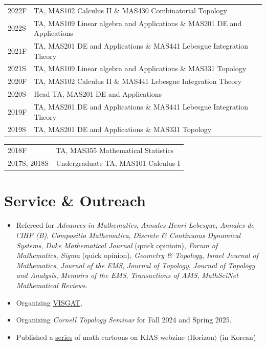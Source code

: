 \documentclass[a4paper, 10pt]{article}
\begin{document}
\begin{tabular}{Q{2.5cm}P{13cm}}
\small{2022F} & TA, MAS102 Calculus II \& MAS430 Combinatorial Topology \\
\small{2022S} & TA, MAS109 Linear algebra and Applications \& MAS201 DE and Applications \\
\small{2021F} & TA, MAS201 DE and Applications \& MAS441 Lebesgue Integration Theory\\
\small{2021S} & TA, MAS109 Linear algebra and Applications \& MAS331 Topology\\
\small{2020F}& TA, MAS102 Calculus II \& MAS441 Lebesgue Integration Theory\\
\small{2020S} & Head TA, MAS201 DE and Applications\\
\small{2019F} & TA, MAS201 DE and Applications \& MAS441 Lebesgue Integration Theory\\
\small{2019S} & TA, MAS201 DE and Applications \& MAS331 Topology\\
\end{tabular}

\begin{tabular}{Q{2.45cm}P{13cm}}
\small{2018F} & TA, MAS355 Mathematical Statistics \\
\small{2017S, 2018S} & Undergraduate TA, MAS101 Calculus I\\
\end{tabular}

\section{Service \& Outreach}
\vspace{5pt}

\begin{itemize}
\item Refereed for \emph{Advances in Mathematics}, \emph{Annales Henri Lebesgue}, \emph{Annales de l'IHP (B)}, \emph{Compositio Mathematica}, \emph{Discrete \& Continuous Dynamical Systems}, \emph{Duke Mathematical Journal} (quick opinioin), \emph{Forum of Mathematics, Sigma} (quick opinion), \emph{Geometry \& Topology}, \emph{Israel Journal of Mathematics}, \emph{Journal of the EMS}, \emph{Journal of Topology}, \emph{Journal of Topology and Analysis}, \emph{Memoirs of the EMS}, \emph{Transactions of AMS}, \emph{MathSciNet Mathematical Reviews}.
\item Organizing \href{visgat.kimsh.kr}{VISGAT}.
\item Organizing \emph{Cornell Topology Seminar} for Fall 2024 and Spring 2025.
\item Published a \href{https://horizon.kias.re.kr/author/\%EC\%B5\%9C\%EC\%9D\%B8\%ED\%98\%81}{series} of math cartoons on KIAS webzine $\langle$Horizon$\rangle$ (in Korean)
\end{itemize}
\end{document}
